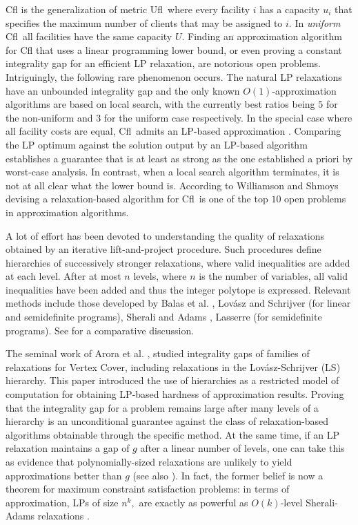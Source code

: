 \documentclass[11pt]{article}
\newcommand{\cfl}{{\sc Cfl}}
\newcommand{\ufl}{{\sc Ufl}}
\begin{document}
\cfl\/ is the generalization of  metric \ufl\ where every facility $i$
has a capacity $u_i$ that specifies the maximum number of clients that
may be assigned to $i.$ In {\em uniform} \cfl\ all facilities have the
same capacity $U.$ Finding  an approximation algorithm for \cfl\/ that
uses  a linear  programming lower  bound, or  even proving  a constant
integrality  gap for an  efficient LP  relaxation, are  notorious open
problems. Intriguingly,  the following rare phenomenon occurs. 
The natural LP relaxations  have an unbounded
integrality gap and the only known $O(1)$-approximation algorithms are
based  on local  search,  with  the currently  best  ratios being  $5$
\cite{BansalGG12} for  the non-uniform and  $3$ \cite{AggarwalLBGGJ12}
for  the uniform  case respectively.  In  the special  case where  all
facility  costs  are equal,  \cfl\  admits  an LP-based  approximation
\cite{LeviSS12}.  Comparing the LP optimum against the solution output
by an LP-based  algorithm establishes a guarantee that  is at least as
strong  as the  one established  a priori  by worst-case  analysis. In
contrast, when a  local search algorithm terminates, it  is not at all
clear what  the lower  bound is.  According  to  Williamson and Shmoys
\cite{ShmoysWbook} devising a  relaxation-based algorithm for \cfl\ is
one of the top $10$ open problems in approximation algorithms.


A lot of effort has been  devoted to 
understanding the quality of relaxations obtained by an iterative 
lift-and-project procedure. Such procedures define hierarchies of 
successively  stronger relaxations, where  valid inequalities are added at 
each level. After at most $n$ levels, where $n$ is the number of 
variables, all valid inequalities have been  added and thus the integer polytope is
expressed. Relevant methods  include those  developed  by Balas et
al. \cite{BalasCC93},  Lov\'{a}sz and Schrijver \cite{LovaszS91} (for
linear and semidefinite programs), 
Sherali and Adams \cite{SheraliA90},    Lasserre  \cite{Lasserre01}
(for semidefinite programs). 
See
\cite{laurent} for a comparative discussion.
  
 The seminal work of Arora et al.  \cite{AroraBLT06}, studied integrality
 gaps  of  families of  relaxations  for  Vertex  Cover,
 including  relaxations    in  the  Lov\'{a}sz-Schrijver  (LS)
 hierarchy.  This  paper  introduced  the  use  of  hierarchies  as  a
 restricted model  of computation  for obtaining LP-based  hardness of
 approximation  results.   Proving  that  the integrality  gap  for  a
 problem  remains  large  after  many  levels of  a  hierarchy  is  an
 unconditional  guarantee   against  the  class   of  relaxation-based
 algorithms obtainable through the specific method.  At the same time,
 if an LP  relaxation maintains a gap of $g$ after  a linear number of
 levels,  one  can  take  this  as evidence  that  polynomially-sized
 relaxations are unlikely to yield approximations better than $g$ (see
 also  \cite{SchoenebeckTT07}).  In fact,  the former  belief is  now a
 theorem   for   maximum    constraint   satisfaction   problems:   
  in terms of approximation,
 LPs of size 
 $n^k,$ are exactly as powerful 
 as $O(k)$-level Sherali-Adams relaxations \cite{ChanLRS13}. 
\end{document}
